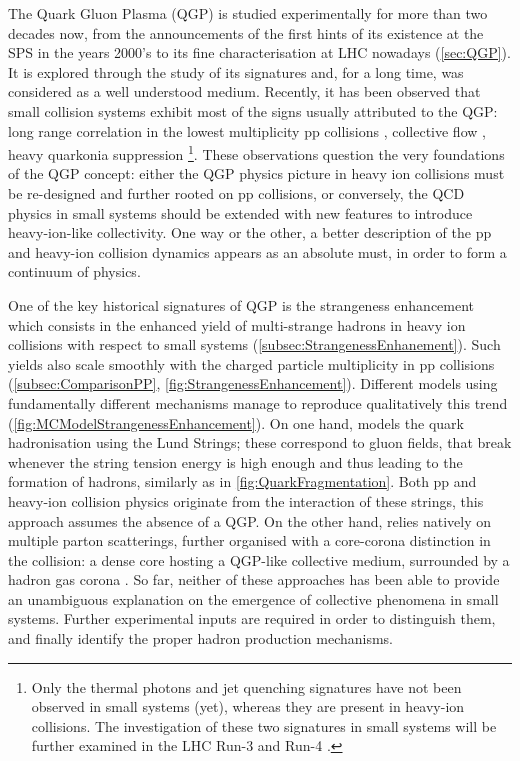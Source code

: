The Quark Gluon Plasma (QGP) is studied experimentally for more than two decades now, from the announcements of the first hints of its existence at the SPS in the years 2000's to its fine characterisation at LHC nowadays (\Sec\ref{sec:QGP}). It is explored through the study of its signatures and, for a long time, was considered as a well understood medium. Recently, it has been observed that small collision systems exhibit most of the signs usually attributed to the QGP: long range correlation in the lowest multiplicity pp collisions \cite{alicecollaborationALICESeesRidge}, collective flow \cite{cmscollaborationEvidenceCollectiveMultiparticle2015}\cite{alicecollaborationAnisotropicFlowFlow2023}, heavy quarkonia suppression \cite{singhCharmoniumSuppressionUltrarelativistic2022}\footnote{Only the thermal photons and jet quenching signatures have not been observed in small systems (yet), whereas they are present in heavy-ion collisions. The investigation of these two signatures in small systems will be further examined in the LHC Run-3 and Run-4 \cite{vanleeuwenHighlightsALICE59th2023}.}. These observations question the very foundations of the QGP concept: either the QGP physics picture in heavy ion collisions must be re-designed and further rooted on pp collisions, or conversely, the QCD physics in small systems should be extended with new features to introduce heavy-ion-like collectivity. One way or the other, a better description of the pp and heavy-ion collision dynamics appears as an absolute must, in order to form a continuum of physics.

One of the key historical signatures of QGP is the strangeness enhancement which consists in the enhanced yield of multi-strange hadrons in heavy ion collisions with respect to small systems (\Sec\ref{subsec:StrangenessEnhanement}). Such yields also scale smoothly with the charged particle multiplicity in pp collisions (\Sec\ref{subsec:ComparisonPP}, \fig\ref{fig:StrangenessEnhancement}). Different models using fundamentally different mechanisms manage to reproduce qualitatively this trend (\fig\ref{fig:MCModelStrangenessEnhancement}). On one hand, \Pythia \cite{bierlichComprehensiveGuidePhysics2022}\cite{skandsTuningPYTHIAMonash2014} models the quark hadronisation using the Lund Strings; these correspond to gluon fields, that break whenever the string tension energy is high enough and thus leading to the formation of hadrons, similarly as in \fig\ref{fig:QuarkFragmentation}. Both pp and heavy-ion collision physics originate from the interaction of these strings, \ie this approach assumes the absence of a QGP. On the other hand, \Epos \cite{wernerCorecoronaProcedureMicrocanonical2023} relies natively on multiple parton scatterings, further organised with a core-corona distinction in the collision: a dense core hosting a QGP-like collective medium, surrounded by a hadron gas corona \cite{wernerAnalysingRadialFlow2014}. So far, neither of these approaches has been able to provide an unambiguous explanation on the emergence of collective phenomena in small systems. Further experimental inputs are required in order to distinguish them, and finally identify the proper hadron production mechanisms. \\

